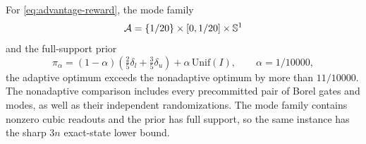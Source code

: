\begin{theorem}\label{thm:adaptive-advantage}
For \eqref{eq:advantage-reward}, the mode family
\[
 \mathcal A=\{1/20\}\times[0,1/20]\times\mathbb S^1
\]
and the full-support prior
\begin{equation}
 \pi_\alpha=(1-\alpha)\left(\tfrac25\delta_l+\tfrac35\delta_u\right)
                 +\alpha\,\mathrm{Unif}(I),\qquad \alpha=1/10000,
 \label{eq:advantage-prior}
\end{equation}
the adaptive optimum exceeds the nonadaptive optimum by more than
$11/10000$. The nonadaptive comparison includes every precommitted pair
of Borel gates and modes, as well as their independent randomizations.
The mode family contains nonzero cubic readouts and the prior has full
support, so the same instance has the sharp $3n$ exact-state lower bound.
\end{theorem}
